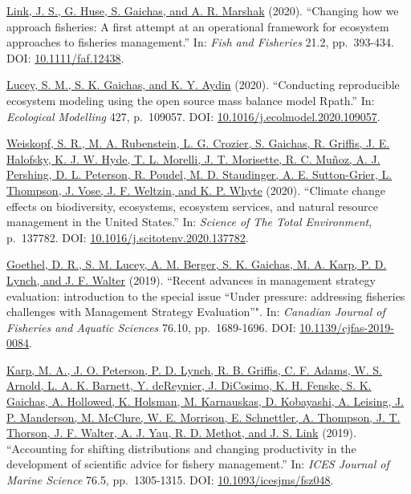 \documentclass[11pt, a4paper]{awesome-cv}
\begin{document}
\protect\hyperlink{cite-link_changing_2020}{Link, J. S., G. Huse, S.
Gaichas, and A. R. Marshak} (2020). ``Changing how we approach
fisheries: A first attempt at an operational framework for ecosystem
approaches to fisheries management.'' In: \emph{Fish and Fisheries}
21.2, pp.~393-434. DOI:
\href{https://doi.org/10.1111\%2Ffaf.12438}{10.1111/faf.12438}.

\protect\hyperlink{cite-lucey_conducting_2020}{Lucey, S. M., S. K.
Gaichas, and K. Y. Aydin} (2020). ``Conducting reproducible ecosystem
modeling using the open source mass balance model Rpath.'' In:
\emph{Ecological Modelling} 427, p.~109057. DOI:
\href{https://doi.org/10.1016\%2Fj.ecolmodel.2020.109057}{10.1016/j.ecolmodel.2020.109057}.

\protect\hyperlink{cite-weiskopf_climate_2020}{Weiskopf, S. R., M. A.
Rubenstein, L. G. Crozier, S. Gaichas, R. Griffis, J. E. Halofsky, K. J.
W. Hyde, T. L. Morelli, J. T. Morisette, R. C. Muñoz, A. J. Pershing, D.
L. Peterson, R. Poudel, M. D. Staudinger, A. E. Sutton-Grier, L.
Thompson, J. Vose, J. F. Weltzin, and K. P. Whyte} (2020). ``Climate
change effects on biodiversity, ecosystems, ecosystem services, and
natural resource management in the United States.'' In: \emph{Science of
The Total Environment}, p.~137782. DOI:
\href{https://doi.org/10.1016\%2Fj.scitotenv.2020.137782}{10.1016/j.scitotenv.2020.137782}.

\protect\hyperlink{cite-goethel_recent_2019}{Goethel, D. R., S. M.
Lucey, A. M. Berger, S. K. Gaichas, M. A. Karp, P. D. Lynch, and J. F.
Walter} (2019). ``Recent advances in management strategy evaluation:
introduction to the special issue ``Under pressure: addressing fisheries
challenges with Management Strategy Evaluation''". In: \emph{Canadian
Journal of Fisheries and Aquatic Sciences} 76.10, pp.~1689-1696. DOI:
\href{https://doi.org/10.1139\%2Fcjfas-2019-0084}{10.1139/cjfas-2019-0084}.

\protect\hyperlink{cite-karp_accounting_2019}{Karp, M. A., J. O.
Peterson, P. D. Lynch, R. B. Griffis, C. F. Adams, W. S. Arnold, L. A.
K. Barnett, Y. deReynier, J. DiCosimo, K. H. Fenske, S. K. Gaichas, A.
Hollowed, K. Holsman, M. Karnauskas, D. Kobayashi, A. Leising, J. P.
Manderson, M. McClure, W. E. Morrison, E. Schnettler, A. Thompson, J. T.
Thorson, J. F. Walter, A. J. Yau, R. D. Methot, and J. S. Link} (2019).
``Accounting for shifting distributions and changing productivity in the
development of scientific advice for fishery management.'' In:
\emph{ICES Journal of Marine Science} 76.5, pp.~1305-1315. DOI:
\href{https://doi.org/10.1093\%2Ficesjms\%2Ffsz048}{10.1093/icesjms/fsz048}.
\end{document}
